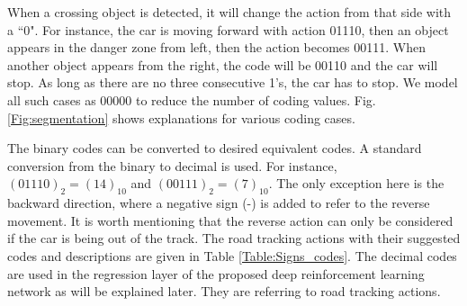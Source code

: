 \documentclass{svproc}
\begin{document}
When a crossing object is detected, it will change the action from that side with a ``0". For instance, the car is moving forward with action 01110, then an object appears in the danger zone from left, then the action becomes 00111. When another object appears from the right, the code will be 00110 and the car will stop. As long as there are no three consecutive 1's, the car has to stop.  We model all such cases as 00000 to reduce the number of coding values. Fig. \ref{Fig:segmentation} shows explanations for various coding cases.

The binary codes can be converted to desired equivalent codes. A standard conversion from the binary to decimal \cite{koren2001computer} is used. For instance, $(01110)_2=(14)_{10}$ and $(00111)_2=(7)_{10}$. The only exception here is the backward direction, where a negative sign (-) is added to refer to the reverse movement. It is worth mentioning that the reverse action can only be considered if the car is being out of the track. The road tracking actions with their suggested codes and descriptions are given in Table \ref{Table:Signs_codes}. The decimal codes are used in the regression layer of the proposed deep reinforcement learning network as will be explained later. They are referring to road tracking actions.
\end{document}
